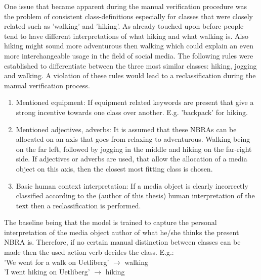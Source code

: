 \newline
One issue that became apparent during the manual verification procedure was the problem of consistent class-definitions especially for classes that were closely related such as 'walking' and 'hiking'. As already touched upon before people tend to have different interpretations of what hiking and what walking is. Also hiking might sound more adventurous then walking which could explain an even more interchangeable usage in the field of social media. The following rules were established to differentiate between the three most similar classes: hiking, jogging and walking. A violation of these rules would lead to a reclassification during the manual verification process.

\begin{enumerate}
    \item Mentioned equipment: If equipment related keywords are present that give a strong incentive towards one class over another. E.g. 'backpack' for hiking.
    \item Mentioned adjectives, adverbs: It is assumed that these NBRAs can be allocated on an axis that goes from relaxing to adventurous. Walking being on the far left, followed by jogging in the middle and hiking on the far-right side. If adjectives or adverbs are used, that allow the allocation of a media object on this axis, then the closest most fitting class is chosen.
    \item Basic human context interpretation: If a media object is clearly incorrectly classified according to the (author of this thesis) human interpretation of the text then a reclassification is performed.
\end{enumerate}

The baseline being that the model is trained to capture the personal interpretation of the media object author of what he/she thinks the present NBRA is. Therefore, if no certain manual distinction between classes can be made then the used action verb decides the class. E.g.:\\
'We went for a walk on Uetliberg' $\to$ walking \\
'I went hiking on Uetliberg' $\to$ hiking\\

